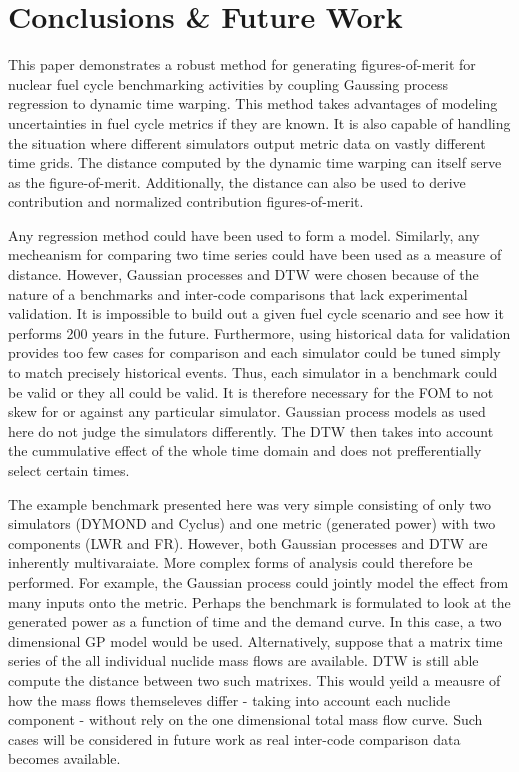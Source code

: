 \section{Conclusions \& Future Work}
\label{conclusion}

This paper demonstrates a robust method for generating figures-of-merit
for nuclear fuel cycle benchmarking activities by coupling Gaussing process
regression to dynamic time warping. This method takes advantages of modeling
uncertainties in fuel cycle metrics if they are known. It is also capable 
of handling the situation where different simulators output metric data on
vastly different time grids. The distance computed by the dynamic time 
warping can itself serve as the figure-of-merit. Additionally, the 
distance can also be used to derive contribution and normalized contribution
figures-of-merit.

Any regression method could have been used to form a model. Similarly, any
mecheanism for comparing two time series could have been used as a measure
of distance.  However, Gaussian processes and DTW were chosen because of 
the nature of a benchmarks and inter-code comparisons that lack experimental
validation. It is impossible to build out a given fuel cycle scenario
and see how it performs 200 years in the future. Furthermore, using 
historical data for validation provides too few cases for comparison and 
each simulator could be tuned simply to match precisely historical events.
Thus, each simulator in a benchmark could be valid or they all could be 
valid. It is therefore necessary for the FOM to not skew for or against 
any particular simulator. Gaussian process models as used here do not 
judge the simulators differently. The DTW then takes into account the 
cummulative effect of the whole time domain and does not prefferentially 
select certain times.

The example benchmark presented here was very simple consisting of only
two simulators (DYMOND and Cyclus) and one metric (generated power) with
two components (LWR and FR).  However, both Gaussian processes and DTW
are inherently multivaraiate. More complex forms of analysis could therefore
be performed. For example, the Gaussian process could jointly model the 
effect from many inputs onto the metric. Perhaps the benchmark is formulated
to look at the generated power as a function of time and the demand curve.
In this case, a two dimensional GP model would be used. Alternatively, 
suppose that a matrix time series of the all individual nuclide mass flows 
are available. DTW is still able compute the distance between two 
such matrixes. This would yeild a meausre of how the mass flows themseleves
differ - taking into account each nuclide component - without rely on the
one dimensional total mass flow curve.  Such cases will be considered in
future work as real inter-code comparison data becomes available.

